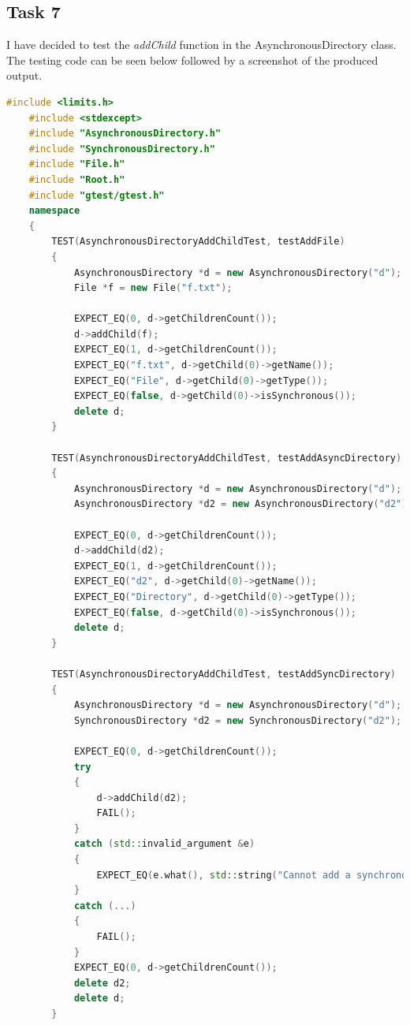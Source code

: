 \documentclass{article}
\begin{document}
\subsection*{Task 7}
I have decided to test the \textit{addChild} function in the AsynchronousDirectory class. The testing code can be seen below
followed by a screenshot of the produced output.
\begin{lstlisting}[language=C++]
    #include <limits.h>
    #include <stdexcept>
    #include "AsynchronousDirectory.h"
    #include "SynchronousDirectory.h"
    #include "File.h"
    #include "Root.h"
    #include "gtest/gtest.h"
    namespace
    {
        TEST(AsynchronousDirectoryAddChildTest, testAddFile)
        {
            AsynchronousDirectory *d = new AsynchronousDirectory("d");
            File *f = new File("f.txt");

            EXPECT_EQ(0, d->getChildrenCount());
            d->addChild(f);
            EXPECT_EQ(1, d->getChildrenCount());
            EXPECT_EQ("f.txt", d->getChild(0)->getName());
            EXPECT_EQ("File", d->getChild(0)->getType());
            EXPECT_EQ(false, d->getChild(0)->isSynchronous());
            delete d;
        }

        TEST(AsynchronousDirectoryAddChildTest, testAddAsyncDirectory)
        {
            AsynchronousDirectory *d = new AsynchronousDirectory("d");
            AsynchronousDirectory *d2 = new AsynchronousDirectory("d2");

            EXPECT_EQ(0, d->getChildrenCount());
            d->addChild(d2);
            EXPECT_EQ(1, d->getChildrenCount());
            EXPECT_EQ("d2", d->getChild(0)->getName());
            EXPECT_EQ("Directory", d->getChild(0)->getType());
            EXPECT_EQ(false, d->getChild(0)->isSynchronous());
            delete d;
        }

        TEST(AsynchronousDirectoryAddChildTest, testAddSyncDirectory)
        {
            AsynchronousDirectory *d = new AsynchronousDirectory("d");
            SynchronousDirectory *d2 = new SynchronousDirectory("d2");

            EXPECT_EQ(0, d->getChildrenCount());
            try
            {
                d->addChild(d2);
                FAIL();
            }
            catch (std::invalid_argument &e)
            {
                EXPECT_EQ(e.what(), std::string("Cannot add a synchronous node to an asynchronous directory"));
            }
            catch (...)
            {
                FAIL();
            }
            EXPECT_EQ(0, d->getChildrenCount());
            delete d2;
            delete d;
        }


\end{lstlisting}
\end{document}
